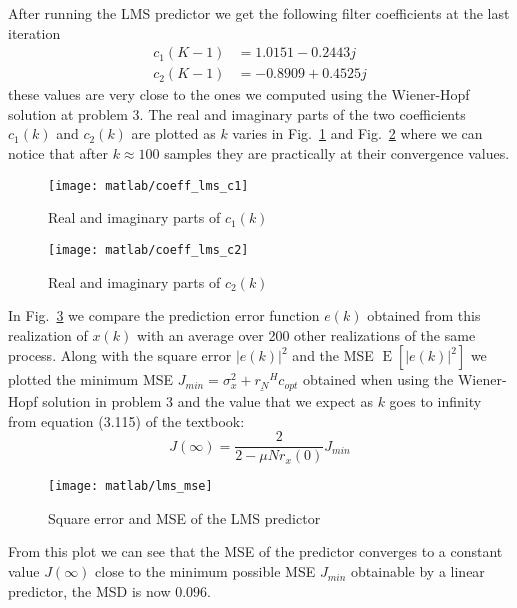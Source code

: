 \documentclass{article}
\renewcommand{\vec}[1]{\underline{#1}}
\newcommand{\E}[1]{\operatorname{E}\left[#1\right]}
\newcommand{\abs}[1]{\left|#1\right|}
\begin{document}
After running the LMS predictor we get the following filter
coefficients at the last iteration
\begin{align*}
  c_1(K-1) &= 1.0151 - 0.2443j   \\
  c_2(K-1) &= -0.8909 + 0.4525j
\end{align*}
these values are very close to the ones we computed using the
Wiener-Hopf solution at problem 3. The real and imaginary parts of the
two coefficients $c_1(k)$ and $c_2(k)$ are plotted as $k$ varies in
Fig.~\ref{plot:coeff_lms_c1} and Fig.~\ref{plot:coeff_lms_c2} where we
can notice that after $k \approx 100$ samples they are practically at
their convergence values.
\begin{figure}[htbp]
  \centering
  \texttt{[image: matlab/coeff\_lms\_c1]}
  \caption{Real and imaginary parts of $c_1(k)$}
  \label{plot:coeff_lms_c1}
\end{figure}
\begin{figure}[htbp]
  \centering
  \texttt{[image: matlab/coeff\_lms\_c2]}
  \caption{Real and imaginary parts of $c_2(k)$}
  \label{plot:coeff_lms_c2}
\end{figure}

In Fig.~\ref{plot:lms_mse} we compare the prediction error function
$e(k)$ obtained from this realization of $x(k)$ with an average over
200 other realizations of the same process.  Along with the square
error $\abs{e(k)}^2$ and the MSE $\E{ \abs{e(k)}^2 }$ we plotted the
minimum MSE $J_{min} = \sigma^2_x + \vec{r_N}^Hc_{opt}$ obtained when
using the Wiener-Hopf solution in problem 3 and the value that we
expect as $k$ goes to infinity from equation (3.115) of the textbook:
\[ J(\infty) = \frac{2}{2-\mu N r_x(0)}J_{min} \]
\begin{figure}[htbp]
  \centering
  \texttt{[image: matlab/lms\_mse]}
  \caption{Square error and MSE of the LMS predictor}
  \label{plot:lms_mse}
\end{figure}
From this plot we can see that the MSE of the predictor converges to a
constant value $J(\infty)$ close to the minimum possible MSE $J_{min}$
obtainable by a linear predictor, the MSD is now $0.096$.
\end{document}

